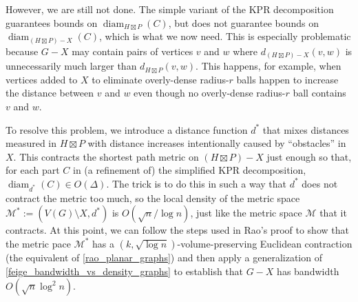 \documentclass{patmorin}
\DeclareMathOperator{\diam}{diam}
\begin{document}
However, we are still not done.  The simple variant of the KPR decomposition guarantees bounds on $\diam_{H\boxtimes P}(C)$, but does not guarantee bounds on $\diam_{(H\boxtimes P)-X}(C)$, which is what we now need.  This is especially problematic because $G-X$ may contain pairs of vertices $v$ and $w$ where $d_{(H\boxtimes P)-X}(v,w)$ is unnecessarily much larger than $d_{H\boxtimes P}(v,w)$.  This happens, for example, when vertices added to $X$ to eliminate overly-dense radius-$r$ balls happen to increase the distance between $v$ and $w$ even though no overly-dense radius-$r$ ball contains $v$ and $w$.

To resolve this problem, we introduce a distance function $d^*$ that mixes distances measured in $H\boxtimes P$ with distance increases intentionally caused by ``obstacles'' in $X$.  This contracts the shortest path metric on $(H\boxtimes P)-X$ just enough so that, for each part $C$ in (a refinement of) the simplified KPR decomposition, $\diam_{d^*}(C)\in O(\Delta)$. The trick is to do this in such a way that $d^*$ does not contract the metric too much, so the local density of the metric space $\mathcal{M}^*:=(V(G)\setminus X,d^*)$ is $O(\sqrt{n}/\log n)$, just like the metric space $\mathcal{M}$ that it contracts.  At this point, we can follow the steps used in Rao's proof to show that the metric pace $\mathcal{M}^*$ has a $(k,\sqrt{\log n})$-volume-preserving Euclidean contraction (the equivalent of \cref{rao_planar_graphs}) and then apply a generalization of \cref{feige_bandwidth_vs_density_graphs} to establish that $G-X$ has bandwidth $O(\sqrt{n}\log^2 n)$.

\end{document}
